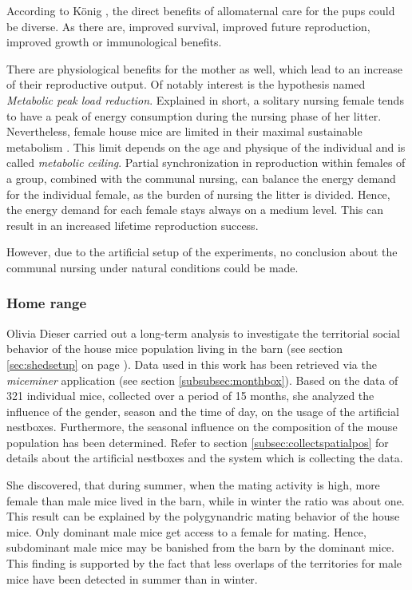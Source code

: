According to K\"onig \cite{koenig:06}, the direct benefits of allomaternal care for the pups could be diverse. As there are, improved survival, improved future reproduction, improved growth or immunological benefits.

There are physiological benefits for the mother as well, which lead to an increase of their reproductive output. Of notably interest is the hypothesis named \textit{Metabolic peak load reduction}. Explained in short, a solitary nursing female tends to have a peak of energy consumption during the nursing phase of her litter. Nevertheless, female house mice are limited in their maximal sustainable metabolism \cite{hammond:92}. This limit depends on the age and physique of the individual and is called \textit{metabolic ceiling}. Partial synchronization in reproduction within females of a group, combined with the communal nursing, can balance the energy demand for the individual female, as the burden of nursing the litter is divided. Hence, the energy demand for each female stays always on a medium level\cite{koenig:06}. This can result in an increased lifetime reproduction success.

However, due to the artificial setup of the experiments, no conclusion about the communal nursing under natural conditions could be made.

\subsubsection{Home range}
\label{subsubsec:homerange}

Olivia Dieser \cite{dieser:08} carried out a long-term analysis to investigate the territorial social behavior of the house mice population living in the barn (see section \ref{sec:shedsetup} on page \pageref{sec:shedsetup}). Data used in this work has been retrieved via the \textit{miceminer} application (see section \ref{subsubsec:monthbox}). Based on the data of 321 individual mice, collected over a period of 15 months, she analyzed the influence of the gender, season and the time of day, on the usage of the artificial nestboxes. Furthermore, the seasonal influence on the composition of the mouse population has been determined. Refer to section \ref{subsec:collectspatialpos} for details about the artificial nestboxes and the system which is collecting the data.

She discovered, that during summer, when the mating activity is high, more female than male mice lived in the barn, while in winter the ratio was about one. This result can be explained by the polygynandric mating behavior of the house mice. Only dominant male mice get access to a female for mating. Hence, subdominant male mice may be banished from the barn by the dominant mice. This finding is supported by the fact that less overlaps of the territories for male mice have been detected in summer than in winter. 

